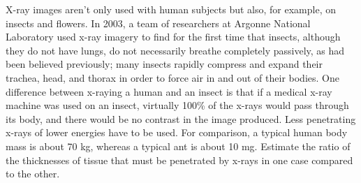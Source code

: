 X-ray images aren't only used with human subjects but also, for example,
on insects and flowers. In 2003, a team of researchers at Argonne National Laboratory
used x-ray imagery to find for the first time that insects, although they do not have
lungs, do not necessarily breathe completely passively, as had been believed previously; many insects rapidly compress and
expand their trachea, head, and thorax in order to force air in and out of their bodies.
One difference between x-raying a human and an insect is that if a medical x-ray machine was
used on an insect, virtually 100\% of the x-rays would pass through its body, and there would
be no contrast in the image produced. Less penetrating x-rays of lower energies have to
be used. For comparison, a typical human body mass is about 70 kg, whereas
a typical ant is about 10 mg. Estimate the ratio of the thicknesses of tissue that must be
penetrated by x-rays in one case compared to the other.\answercheck
